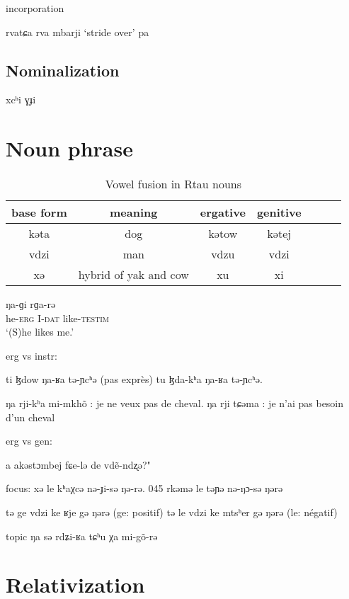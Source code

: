 \documentclass[oneside,a4paper,11pt]{article}
\newcommand{\ipa}[1]{{\phon #1}} %
\begin{document}
 
incorporation

\ipa{rvatɕa} \ipa{rva}
\ipa{mbarji} `stride over' \ipa{pa}

 

\subsection{Nominalization}

\ipa{xcʰi} \ipa{ɣɟi}

 \section{Noun phrase}
\begin{table}[H]
\caption{Vowel fusion in Rtau nouns} \label{tab:alternation.noun} \centering
\begin{tabular}{c|cccccc}
\toprule
base form & meaning & ergative & genitive \\
\midrule
\ipa{kəta} & dog & \ipa{kətow} & \ipa{kətej} & \\
\ipa{vdzi} & man & \ipa{vdzu} & \ipa{vdzi} & \\
\ipa{xə} & hybrid of yak and cow & \ipa{xu} & \ipa{xi} & \\
\bottomrule
\end{tabular}
\end{table}

\begin{exe}
\ex \label{ex:rga}
\gll \ipa{tə-w}  	\ipa{ŋa-ɡi}  	\ipa{rɡa-rə}  
 \\
he-\textsc{erg} I-\textsc{dat} like-\textsc{testim} \\
\glt `(S)he likes me.'
\end{exe}

erg vs instr:


	ti ɮdow ŋa-ʁa tə-ɲcʰə (pas exprès)
	tu ɮda-kʰa ŋa-ʁa tə-ɲcʰə.
	
	
		ŋa rji-kʰa mi-mkhõ : je ne veux pas de cheval.
	ŋa rji tɕəma : je n'ai pas besoin d'un cheval

erg vs gen:

a akəstɔmbej fɕe-lə de vdẽ-ndʐə?"

focus:
xə le kʰaχcə nə-ɟi-sə ŋə-rə.
045	rkəmə le təɲə nə-ŋɔ-sə ŋərə

		tə ge vdzi ke ʁje gə ŋərə (ge: positif)
		tə le vdzi ke mtsʰer gə ŋərə (le: négatif)


topic
ŋa sə rdʑi-ʁa tɕʰu χa mi-gõ-rə 

\section{Relativization}
\end{document}
